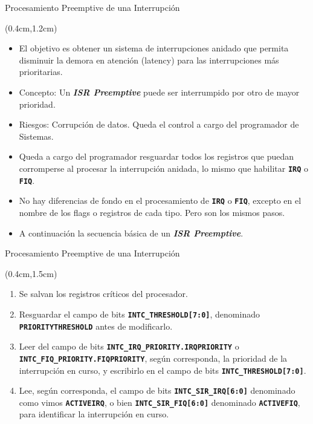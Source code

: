 \documentclass[usenames,table,xcolor={x11names},aspectratio=169]{beamer}
\newcounter{saveenumi}
\newcommand{\seti}{\setcounter{saveenumi}{\value{enumi}}}
\begin{document}
\begin{frame}[t,fragile]{Procesamiento Preemptive de una Interrupción}
 \begin{textblock*}{\textwidth}(0.4cm,1.2cm)
  \begin{itemize}[<+(1)->]\justifying
   \item El objetivo es obtener un sistema de interrupciones anidado que permita disminuir la demora en atención (latency) para las interrupciones más prioritarias.
   \item Concepto: Un \textit{\textbf{ISR Preemptive}} puede ser interrumpido por otro de mayor prioridad.
   \item Riesgos: Corrupción de datos. Queda el control a cargo del programador de Sistemas.
   \item Queda a cargo del programador resguardar todos los registros que puedan corromperse al procesar la interrupción anidada, lo mismo que habilitar \texttt{\textbf{IRQ}} o \texttt{\textbf{FIQ}}.
   \item No hay diferencias de fondo en el procesamiento de \texttt{\textbf{IRQ}} o \texttt{\textbf{FIQ}}, excepto en el nombre de los flags o registros de cada tipo. Pero son los mismos pasos.
   \item A continuación la secuencia básica de un \textit{\textbf{ISR Preemptive}}.
  \end{itemize}
 \end{textblock*}
\end{frame}

\begin{frame}[t,fragile]{Procesamiento Preemptive de una Interrupción}
 \begin{textblock*}{\textwidth}(0.4cm,1.5cm)
  \begin{enumerate}[<+(1)->]\justifying \parskip 0.25cm
   \item Se salvan los registros críticos del procesador.
   \item Resguardar el campo de bits \texttt{\textbf{INTC\_THRESHOLD[7:0]}}, denominado \textbf{\texttt{PRIORITYTHRESHOLD}} antes de modificarlo.
   \item Leer del campo de bits \texttt{\textbf{INTC\_IRQ\_PRIORITY.IRQPRIORITY}} o \texttt{\textbf{INTC\_FIQ\_PRIORITY.FIQPRIORITY}}, según corresponda, la prioridad de la interrupción en curso, y escribirlo en el campo de bits \texttt{\textbf{INTC\_THRESHOLD[7:0]}}.
   \item Lee, según corresponda, el campo de bits \texttt{\textbf{INTC\_SIR\_IRQ[6:0]}} denominado como  vimos \texttt{\textbf{ACTIVEIRQ}}, o bien \texttt{\textbf{INTC\_SIR\_FIQ[6:0]}} denominado \texttt{\textbf{ACTIVEFIQ}}, para identificar la interrupción en curso.
   \seti
  \end{enumerate}
 \end{textblock*}
\end{frame}
\end{document}
